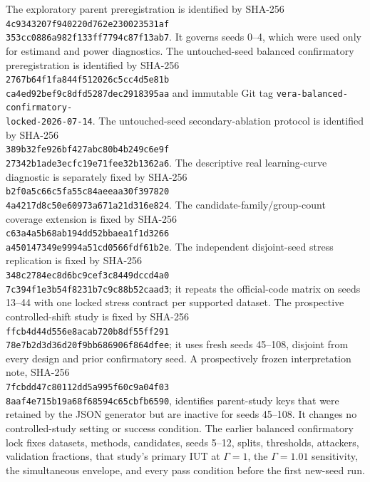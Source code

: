 The exploratory parent preregistration is identified by SHA-256\\
\texttt{4c9343207f940220d762e230023531af}\\
\texttt{353cc0886a982f133ff7794c87f13ab7}. It governs seeds 0--4, which
were used only for estimand and power diagnostics. The untouched-seed balanced
confirmatory preregistration is identified by SHA-256\\
\texttt{2767b64f1fa844f512026c5cc4d5e81b}\\
\texttt{ca4ed92bef9c8dfd5287dec2918395aa} and immutable Git tag
\texttt{vera-balanced-confirmatory-}\\
\texttt{locked-2026-07-14}.
The untouched-seed secondary-ablation protocol is identified by SHA-256\\
\texttt{389b32fe926bf427abc80b4b249c6e9f}\\
\texttt{27342b1ade3ecfc19e71fee32b1362a6}.
The descriptive real learning-curve diagnostic is separately fixed by SHA-256\\
\texttt{b2f0a5c66c5fa55c84aeeaa30f397820}\\
\texttt{4a4217d8c50e60973a671a21d316e824}.
The candidate-family/group-count coverage extension is fixed by SHA-256\\
\texttt{c63a4a5b68ab194dd52bbaea1f1d3266}\\
\texttt{a450147349e9994a51cd0566fdf61b2e}.
The independent disjoint-seed stress replication is fixed by SHA-256\\
\texttt{348c2784ec8d6bc9cef3c8449dccd4a0}\\
\texttt{7c394f1e3b54f8231b7c9c88b52caad3}; it repeats the official-code
matrix on seeds 13--44 with one locked stress contract per supported dataset.
The prospective controlled-shift study is fixed by SHA-256\\
\texttt{ffcb4d44d556e8acab720b8df55ff291}\\
\texttt{78e7b2d3d36d20f9bb686906f864dfee}; it uses fresh seeds 45--108,
disjoint from every design and prior confirmatory seed.
A prospectively frozen interpretation note, SHA-256\\
\texttt{7fcbdd47c80112dd5a995f60c9a04f03}\\
\texttt{8aaf4e715b19a68f68594c65cbfb6590}, identifies parent-study keys that
were retained by the JSON generator but are inactive for seeds 45--108. It
changes no controlled-study setting or success condition.
The earlier balanced confirmatory lock fixes datasets, methods, candidates,
seeds 5--12, splits,
thresholds, attackers, validation fractions, that study's primary IUT at
$\Gamma=1$,
the $\Gamma=1.01$ sensitivity, the simultaneous envelope, and every pass
condition before the first new-seed run.

